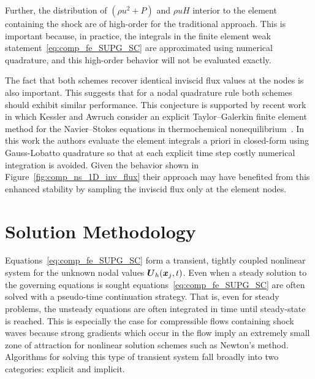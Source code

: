 Further, the distribution of $\left(\rho u^2 + P\right)$ and $\rho u H$ interior to the element containing the shock are of high-order for the traditional approach.  This is important because, in practice, the integrals in the finite element weak statement~\eqref{eq:comp_fe_SUPG_SC} are approximated using numerical quadrature, and this high-order behavior will not be evaluated exactly.

The fact that both schemes recover identical inviscid flux values at the nodes is also important.  This suggests that for a nodal quadrature rule both schemes should exhibit similar performance.  This conjecture is supported by recent work in which Kessler and Awruch consider an explicit Taylor--Galerkin finite element method for the Navier--Stokes equations in thermochemical nonequilibrium~\cite{hypersonic_taylor_galerkin}.  In this work the authors evaluate the element integrals a priori in closed-form using Gauss-Lobatto quadrature so that at each explicit time step costly numerical integration is avoided.  Given the behavior shown in Figure~\ref{fig:comp_ns_1D_inv_flux} their approach may have benefited from this enhanced stability by sampling the inviscid flux only at the element nodes.


\section{Solution Methodology\label{sec:comp_solution_methodology}}
Equations~\eqref{eq:comp_fe_SUPG_SC} form a transient, tightly coupled nonlinear system for the unknown nodal values ${\boldsymbol{U}}_h({\boldsymbol{x}}_j,t)$.  Even when a steady solution to the governing equations is sought equations~\eqref{eq:comp_fe_SUPG_SC} are often solved with a pseudo-time continuation strategy.  That is, even for steady problems, the unsteady equations are often integrated in time until steady-state is reached.  This is especially the case for compressible flows containing shock waves because strong gradients which occur in the flow imply an extremely small zone of attraction for nonlinear solution schemes such as Newton's method. Algorithms for solving this type of transient system fall broadly into two categories: explicit and implicit.

